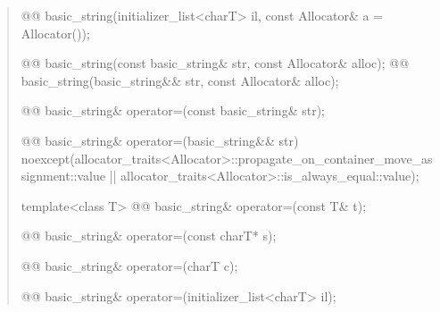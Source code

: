 \documentclass{wg21}
\begin{document}
\begin{quote}
\begin{itemdecl}
@@ basic_string(initializer_list<charT> il, const Allocator& a = Allocator());
\end{itemdecl}

\begin{itemdecl}
@@ basic_string(const basic_string& str, const Allocator& alloc);
@@ basic_string(basic_string&& str, const Allocator& alloc);
\end{itemdecl}

\begin{itemdecl}
@@ basic_string& operator=(const basic_string& str);
\end{itemdecl}

\begin{itemdecl}
@@ basic_string& operator=(basic_string&& str)
  noexcept(allocator_traits<Allocator>::propagate_on_container_move_assignment::value ||
           allocator_traits<Allocator>::is_always_equal::value);
\end{itemdecl}

\begin{itemdecl}
template<class T>
  @@ basic_string& operator=(const T& t);
\end{itemdecl}

\begin{itemdecl}
@@ basic_string& operator=(const charT* s);
\end{itemdecl}

\begin{itemdecl}
@@ basic_string& operator=(charT c);
\end{itemdecl}

\begin{itemdecl}
@@ basic_string& operator=(initializer_list<charT> il);
\end{itemdecl}
\end{quote}
\end{document}

